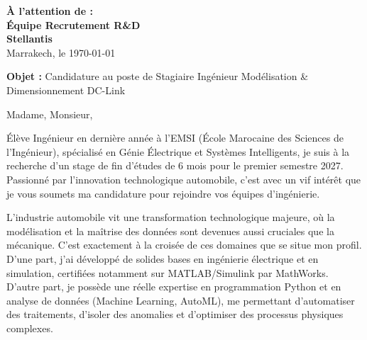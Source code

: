 \documentclass[10pt,a4paper]{altacv}
\makeatletter
\renewcommand{\makecvheader}{%
  \begingroup
    \raggedright\color{emphasis}%
    {\Huge\bfseries\MakeUppercase{\@name}\par}
    \medskip
    {\large\bfseries\color{accent}\@tagline\par}
    \medskip
    {\footnotesize\bfseries\@personalinfo\par}
  \endgroup\medskip
}
\makeatother
\begin{document}

\makecvheader

\bigskip

\begin{flushright}
  {\color{emphasis}\textbf{À l'attention de :}} \\[2pt]
  \textbf{Équipe Recrutement R\&D} \\
  \textbf{Stellantis} \\[20pt]
  Marrakech, le \today
\end{flushright}
\bigskip

\bigskip

{\color{accent}\textbf{Objet :}} Candidature au poste de Stagiaire Ingénieur Modélisation \& Dimensionnement DC-Link

\bigskip\bigskip

Madame, Monsieur,

\vspace{0.4cm}

Élève Ingénieur en dernière année à l'EMSI (École Marocaine des Sciences de l'Ingénieur), spécialisé en Génie Électrique et Systèmes Intelligents, je suis à la recherche d'un stage de fin d'études de 6 mois pour le premier semestre 2027. Passionné par l'innovation technologique automobile, c'est avec un vif intérêt que je vous soumets ma candidature pour rejoindre vos équipes d'ingénierie.

\vspace{0.4cm}

L'industrie automobile vit une transformation technologique majeure, où la modélisation et la maîtrise des données sont devenues aussi cruciales que la mécanique. C'est exactement à la croisée de ces domaines que se situe mon profil. D'une part, j'ai développé de solides bases en ingénierie électrique et en simulation, certifiées notamment sur MATLAB/Simulink par MathWorks. D'autre part, je possède une réelle expertise en programmation Python et en analyse de données (Machine Learning, AutoML), me permettant d'automatiser des traitements, d'isoler des anomalies et d'optimiser des processus physiques complexes.
\end{document}
